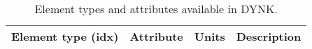 \documentclass[a4paper,11pt]{report}
\begin{document}
\begin{table}[h]
\begin{center}
\caption{Element types and attributes available in DYNK.}
\label{tab:DYNK_SET} %
\begin{tabular}{|l | l l p{6cm}|}

  \hline
  \rowcolor{blue!30}
  Element type (idx) & Attribute & Units & Description \\
  \hline


  


\end{tabular}
\end{center}
\end{table}
\end{document}
